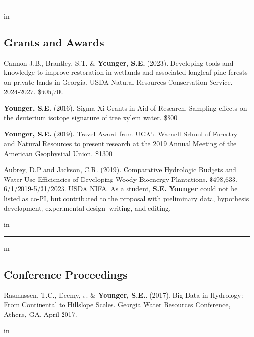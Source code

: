\documentclass[10pt,letterpaper]{article}
\begin{document}
	\hrule
	\vspace{-0.4em}
	 in
	\subsection*{Grants and Awards}
	
	\begin{hangparas}{.25in}{1}
		
		Cannon J.B., Brantley, S.T. \& \textbf{Younger, S.E.} (2023). Developing tools and knowledge to improve restoration in wetlands and associated longleaf pine forests on private lands in Georgia. USDA Natural Resources Conservation Service. 2024-2027. \$605,700
		
		\textbf{Younger, S.E.} (2016). Sigma Xi Grants-in-Aid of Research. Sampling effects on the deuterium isotope signature of tree xylem water. \$800
		
		\textbf{Younger, S.E.} (2019). Travel Award from UGA's Warnell School of Forestry and Natural Resources to present research at the 2019 Annual Meeting of the American Geophysical Union. \$1300
		
		Aubrey, D.P and Jackson, C.R. (2019). Comparative Hydrologic Budgets and Water Use Efficiencies of Developing Woody Bioenergy Plantations. \$498,633. 6/1/2019-5/31/2023. USDA NIFA. As a student, \textbf{S.E. Younger} could not be listed as co-PI, but contributed to the proposal with preliminary data, hypothesis development, experimental design, writing, and editing.
		
		\vspace{-0.4em}
		 in
		
	\end{hangparas}
	
	\hrule
	\vspace{-0.4em}
	 in
	\subsection*{Conference Proceedings}
	
	\begin{hangparas}{.25in}{1}
		
		Rasmussen, T.C., Deemy, J. \& \textbf{Younger, S.E.}. (2017). Big Data in Hydrology: From Continental to Hillslope Scales. Georgia Water Resources Conference, Athens, GA. April 2017.
		
	\end{hangparas}
	
	 in
	
\end{document}
